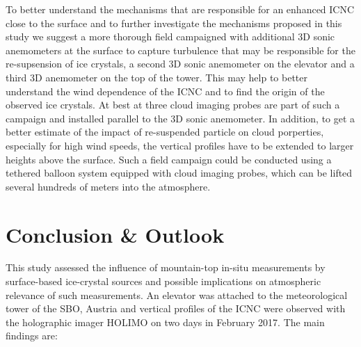 \documentclass[draft,linenumbers]{agujournal}
\begin{document}
To better understand the mechanisms that are responsible for an enhanced ICNC close to the surface and to further investigate the mechanisms proposed in this study we suggest a more thorough field campaigned with additional 3D sonic anemometers at the surface to capture turbulence that may be responsible for the re-supsension of ice crystals, a second 3D sonic anemometer on the elevator and a third 3D anemometer on the top of the tower. This may help to better understand the wind dependence of the ICNC and to find the origin of the observed ice crystals. At best at three cloud imaging probes are part of such a campaign and installed parallel to the 3D sonic anemometer. In addition, to get a better estimate of the impact of re-suspended particle on cloud porperties, especially for high wind speeds, the vertical profiles have to be extended to larger heights above the surface. Such a field campaign could be conducted using a tethered balloon system equipped with cloud imaging probes, which can be lifted several hundreds of meters into the atmosphere.

\section{Conclusion \& Outlook}
This study assessed the influence of mountain-top in-situ measurements by surface-based ice-crystal sources and possible implications on atmospheric relevance of such measurements. An elevator was attached to the meteorological tower of the SBO, Austria and vertical profiles of the ICNC were observed with the holographic imager HOLIMO on two days in February 2017. The main findings are:
\end{document}
